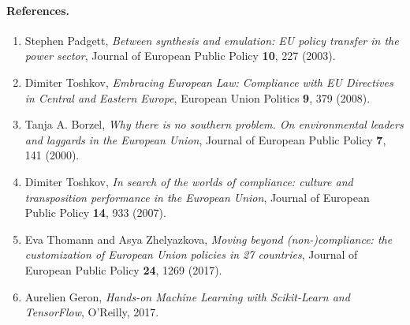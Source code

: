 \documentclass[%
oneside,                 %
final,                   %
10pt]{article}
\begin{document}
\paragraph{References.}
\begin{enumerate}
\item Stephen   Padgett, \emph{Between synthesis and emulation: EU policy transfer in the power sector}, Journal of European Public Policy \textbf{10}, 227 (2003).

\item Dimiter Toshkov, \emph{Embracing European Law: Compliance with EU Directives in Central and Eastern Europe}, European Union Politics \textbf{9}, 379 (2008).

\item Tanja A. Borzel, \emph{Why there is no southern problem. On environmental leaders and laggards in the European Union}, Journal of European Public Policy \textbf{7}, 141 (2000).

\item Dimiter Toshkov, \emph{In search of the worlds of compliance: culture and transposition performance in the European Union}, Journal of European Public Policy \textbf{14}, 933 (2007).

\item Eva Thomann and Asya Zhelyazkova, \emph{Moving beyond (non-)compliance: the customization of European Union policies in 27 countries}, Journal of European Public Policy \textbf{24}, 1269 (2017). 

\item Aurelien Geron, \emph{Hands-on Machine Learning with Scikit-Learn and TensorFlow}, O'Reilly, 2017.
\end{enumerate}

\noindent


\end{document}
